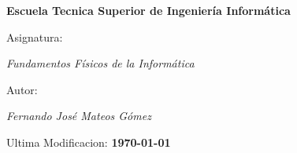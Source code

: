 \begin{titlepage}
        \centering
        {\bfseries\LARGE Escuela Tecnica Superior de Ingeniería Informática \par}
        \vspace{1cm}
        {\Large Asignatura: \par \textit{Fundamentos Físicos de la Informática} \par}
        \vspace{1cm}
        {\Large Autor: \par \textit{Fernando José Mateos Gómez} \par}
        \vspace{2cm}
        {\Large Ultima Modificacion: \textbf{\today} \par}
        \vspace{2cm}
\end{titlepage}
\restoregeometry